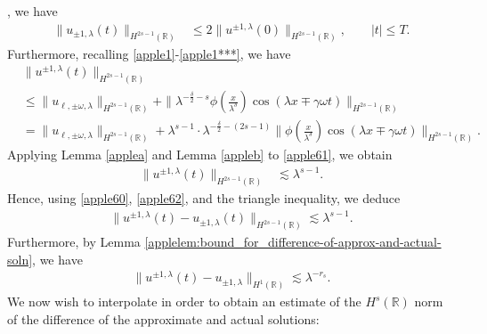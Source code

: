 \documentclass[12pt,reqno]{amsart}
\newcommand{\rr}{\mathbb{R}}
\theoremstyle{plain}  %
\theoremstyle{definition}
\begin{document}
, we
have
\begin{equation}
	\begin{split}
		\|u_{\pm 1,\lambda} (t) \|_{H^{2s-1}(\rr)}
		& \le 2 \|u^{\pm 1,\lambda}(0) \|_{H^{2s-1}(\rr)}, \qquad
		|t| \le T.
		\label{apple60}
	\end{split}
\end{equation}
Furthermore, recalling \eqref{apple1}-\eqref{apple1***}, we have 
\begin{equation}
	\begin{split}
		& \|u^{\pm 1, \lambda}(t)\|_{H^{2s-1}(\rr)}
		\\
		& \le \|u_{\ell, \pm \omega, \lambda}\|_{H^{2s-1}(\rr)} +
		 \| \lambda^{-\frac{\delta}{2} -s} \phi \left(
		\frac{x}{\lambda^\delta} \right) \cos(\lambda x \mp \gamma \omega t)
		\|_{H^{2s-1}(\rr)}
		\\
		& = \|u_{\ell, \pm \omega, \lambda}\|_{H^{2s-1}(\rr)}
		+
		\lambda^{s-1} \cdot
		\lambda^{-\frac{\delta}{2}-(2s-1)} \|\phi \left(
		\frac{x}{\lambda^\delta} \right) \cos(\lambda x \mp \gamma \omega t)
		\|_{H^{2s-1}(\rr)}.
		\label{apple61}
	\end{split}
\end{equation}
Applying Lemma \ref{applea} and Lemma \ref{appleb} to \eqref{apple61}, we obtain
\begin{equation}
	\begin{split}
		\|u^{\pm 1, \lambda}(t) \|_{H^{2s-1}(\rr)}
		& \lesssim \lambda^{s-1}.
		\label{apple62}
	\end{split}
\end{equation}
Hence, using \eqref{apple60}, \eqref{apple62}, and the triangle inequality, we deduce
\begin{equation}
	\begin{split}
		\|u^{\pm 1, \lambda}(t) - u_{\pm 1, \lambda}(t) \|_{H^{2s-1}(\rr)}
		\lesssim \lambda^{s-1}.
		\label{apple63}
	\end{split}
\end{equation}
Furthermore, by Lemma
\ref{applelem:bound_for_difference-of-approx-and-actual-soln}, we have
\begin{equation}
	\begin{split}
		\|u^{\pm 1, \lambda}(t) - u_{\pm 1, \lambda} \|_{H^1(\rr)} \lesssim
		\lambda^{-r_s}.
		\label{apple64}
	\end{split}
\end{equation}
		We now wish to interpolate in order to obtain an estimate of the $H^s (\rr)$
		norm of the difference of the approximate and actual solutions:
\end{document}
